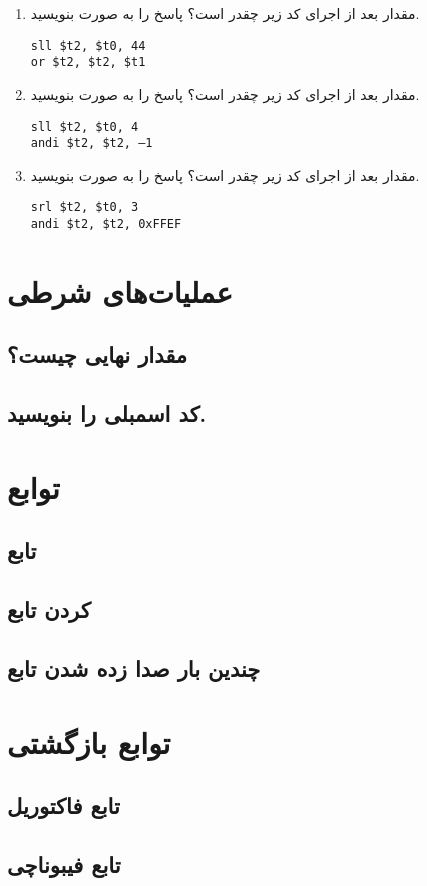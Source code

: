 \documentclass[11pt, dvipsnames, svgnames, x11names]{article}
\begin{document}
\begin{enumerate}
\item 
مقدار  بعد از اجرای کد زیر چقدر است؟ پاسخ را به صورت  بنویسید.

\begin{latin}
\begin{lstlisting}
sll $t2, $t0, 44
or $t2, $t2, $t1
\end{lstlisting}
\end{latin}
\item 
مقدار  بعد از اجرای کد زیر چقدر است؟ پاسخ را به صورت  بنویسید.

\begin{latin}
\begin{lstlisting}[keywords={sll, andi}]
sll $t2, $t0, 4
andi $t2, $t2, –1
\end{lstlisting}
\end{latin}

\item 
مقدار  بعد از اجرای کد زیر چقدر است؟ پاسخ را به صورت  بنویسید.

\begin{latin}
\begin{lstlisting}[keywords={srl, andi}]
srl $t2, $t0, 3
andi $t2, $t2, 0xFFEF
\end{lstlisting}
\end{latin}
\end{enumerate}

\section{عملیات‌های شرطی }
\subsection{مقدار نهایی چیست؟}
\subsection{کد اسمبلی را بنویسید.}

\section{توابع}
\subsection{تابع }
\subsection{ کردن تابع}
\subsection{چندین‌ بار صدا زده شدن تابع}

\section{توابع بازگشتی}
\subsection{تابع فاکتوریل}
\subsection{تابع فیبوناچی}
\end{document}
